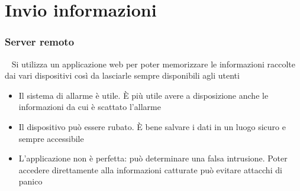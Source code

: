 \documentclass{beamer}
\begin{document}
\section{Invio informazioni}
\begin{frame}
\frametitle{Server remoto}
\begin{block}{~}
Si utilizza un applicazione web per poter memorizzare le informazioni raccolte dai vari dispositivi così da lasciarle sempre disponibili agli utenti
\end{block}
\begin{itemize}
  \item Il sistema di allarme è utile. \`E più utile avere a disposizione anche le informazioni da cui è scattato l'allarme
  \item Il dispositivo può essere rubato. \`E bene salvare i dati in un luogo sicuro e sempre accessibile
  \item L'applicazione non è perfetta: può determinare una falsa intrusione. Poter accedere direttamente alla informazioni catturate può evitare attacchi di panico
\end{itemize}
\end{frame}
\end{document}
